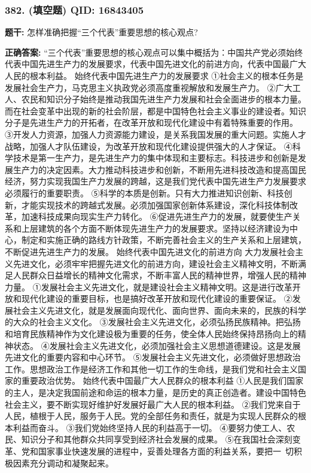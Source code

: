\documentclass[12pt,UTF8]{ctexart}
\begin{document}
\subsubsection*{382. (填空题) \small QID: 16843405}

\textbf{题干:}
怎样准确把握“三个代表”重要思想的核心观点?

\textbf{正确答案:}
“三个代表”重要思想的核心观点可以集中概括为：中国共产党必须始终代表中国先进生产力的发展要求，代表中国先进文化的前进方向，代表中国最广大人民的根本利益。
始终代表中国先进生产力的发展要求
①社会主义的根本任务是发展社会生产力，马克思主义执政党必须高度重视解放和发展生产力。
②广大工人、农民和知识分子始终是推动我国先进生产力发展和社会全面进步的根本力量。而在社会变革中出现的新的社会阶层，都是中国特色社会主义事业的建设者。知识分子是先进生产力的开拓者，在改革开放和现代化建设中有着特殊重要的作用。
③开发人力资源，加强人力资源能力建设，是关系我国发展的重大问题。实施人才战略，加强人才队伍建设，为改革开放和现代化建设提供强大的人才保证。
④科学技术是第一生产力，是先进生产力的集中体现和主要标志。科技进步和创新是发展生产力的决定因素。大力推动科技进步和创新，不断用先进科技改造和提高国民经济，努力实现我国生产力发展的跨越，这是我们党代表中国先进生产力发展要求必须履行的重要职责。
⑤科学的本质是创新。只有大力推进知识创新、科技创新，才能实现技术的跨越式发展。必须加强国家创新体系建设，深化科技体制改革，加速科技成果向现实生产力转化。
⑥促进先进生产力的发展，就要使生产关系和上层建筑的各个方面不断体现先进生产力的发展要求。坚持以经济建设为中心，制定和实施正确的路线方针政策，不断完善社会主义的生产关系和上层建筑，不断促进先进生产力的发展。
始终代表中国先进文化的前进方向
大力发展社会主义先进文化，必须牢牢把握先进文化的前进方向，建设社会主义精神文明，不断满足人民群众日益增长的精神文化需求，不断丰富人民的精神世界，增强人民的精神力量。
①发展社会主义先进文化，就是建设社会主义精神文明。这是进行改革开放和现代化建设的重要目标，也是搞好改革开放和现代化建设的重要保证。
②发展社会主义先进文化，就是发展面向现代化、面向世界、面向未来的，民族的科学的大众的社会主义文化。
③发展社会主义先进文化，必须弘扬民族精神。把弘扬和培育民族精神作为文化建设极为重要的任务，使全体人民始终保持昂扬向上的精神状态。
④发展社会主义先进文化，必须加强社会主义思想道德建设。这是发展先进文化的重要内容和中心环节。
⑤发展社会主义先进文化，必须做好思想政治工作。思想政治工作是经济工作和其他一切工作的生命线，是我们党和社会主义国家的重要政治优势。
始终代表中国最广大人民群众的根本利益
①人民是我们国家的主人，是决定我国前途和命运的根本力量，是历史的真正创造者。建设中国特色社会主义，要不断实现好维护好发展好最广大人民的根本利益。
②我们党来自于人民，植根于人民，服务于人民。党的全部任务和责任，就是为实现人民群众的根本利益而奋斗。
③我们党始终坚持人民的利益高于一切。
④要努力使工人、农民、知识分子和其他群众共同享受到经济社会发展的成果。
⑤在我国社会深刻变革、党和国家事业快速发展的进程中，妥善处理各方面的利益关系，要把一 切积极因素充分调动和凝聚起来。
\end{document}
